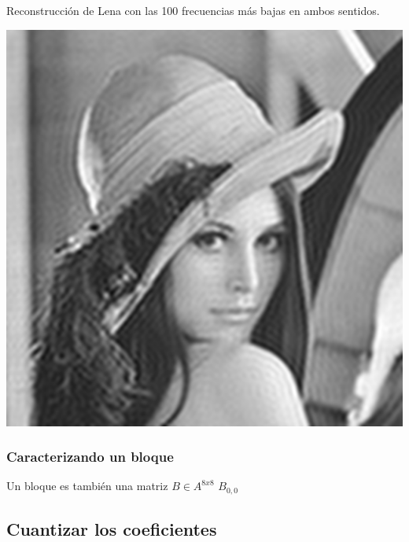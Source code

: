 \documentclass{beamer}
\begin{document}
\begin{frame}
    Reconstrucción de Lena con las 100 frecuencias más bajas en ambos sentidos.
    \begin{center}
        \includegraphics[scale=0.4]{fig/lenas_100frecuencias.png}
    \end{center}
\end{frame}


\begin{frame}
    \frametitle{Caracterizando un bloque}
    Un bloque es también una matriz $B \in A^{8x8}$
    \vspace{5mm}
    $B_{0,0}$
\end{frame}


\subsection{Cuantizar los coeficientes}
\end{document}
